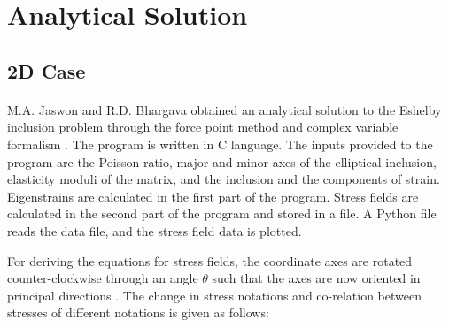 \documentclass[12pt, a4paper]{report}
\begin{document}
\section{Analytical Solution}
\subsection{2D Case}
\paragraph{}
M.A. Jaswon and R.D. Bhargava obtained an analytical solution to the Eshelby inclusion problem through the force point method and complex variable formalism \cite{jaswon_bhargava_1961}. The program is written in C language. The inputs provided to the program are the Poisson ratio, major and minor axes of the elliptical inclusion, elasticity moduli of the matrix, and the inclusion and the components of strain. Eigenstrains are calculated in the first part of the program. Stress fields are calculated in the second part of the program and stored in a file. A Python file reads the data file, and the stress field data is plotted.

For deriving the equations for stress fields, the coordinate axes are rotated counter-clockwise through an angle $\theta$ such that the axes are now oriented in principal directions \cite{jaswon_bhargava_1961}. The change in stress notations and co-relation between stresses of different notations is given as follows:
\end{document}
